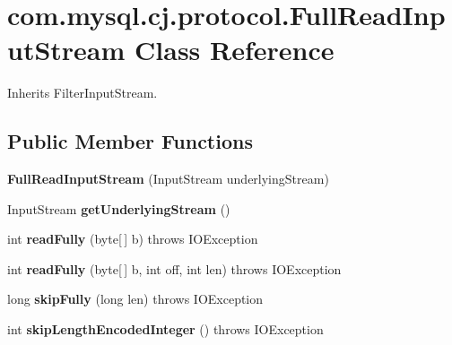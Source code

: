 \hypertarget{classcom_1_1mysql_1_1cj_1_1protocol_1_1_full_read_input_stream}{}\section{com.\+mysql.\+cj.\+protocol.\+Full\+Read\+Input\+Stream Class Reference}
\label{classcom_1_1mysql_1_1cj_1_1protocol_1_1_full_read_input_stream}


Inherits Filter\+Input\+Stream.

\subsection*{Public Member Functions}
\begin{DoxyCompactItemize}
\item 
\mbox{\label{classcom_1_1mysql_1_1cj_1_1protocol_1_1_full_read_input_stream_a130d34d6a6733b58df753dd2387398e3}} 
{\bfseries Full\+Read\+Input\+Stream} (Input\+Stream underlying\+Stream)
\item 
\mbox{\label{classcom_1_1mysql_1_1cj_1_1protocol_1_1_full_read_input_stream_a0d7c455b08cbaecf1bccf13332902e80}} 
Input\+Stream {\bfseries get\+Underlying\+Stream} ()
\item 
\mbox{\label{classcom_1_1mysql_1_1cj_1_1protocol_1_1_full_read_input_stream_a99afc4ea0c7401e413b2a563118d8b54}} 
int {\bfseries read\+Fully} (byte\mbox{[}$\,$\mbox{]} b)  throws I\+O\+Exception 
\item 
\mbox{\label{classcom_1_1mysql_1_1cj_1_1protocol_1_1_full_read_input_stream_aaa9ec02b3506e269f2c62e8a829244cd}} 
int {\bfseries read\+Fully} (byte\mbox{[}$\,$\mbox{]} b, int off, int len)  throws I\+O\+Exception 
\item 
\mbox{\label{classcom_1_1mysql_1_1cj_1_1protocol_1_1_full_read_input_stream_ae18612336a0a065c22bcdf5da96f178b}} 
long {\bfseries skip\+Fully} (long len)  throws I\+O\+Exception 
\item 
\mbox{\label{classcom_1_1mysql_1_1cj_1_1protocol_1_1_full_read_input_stream_a2fbcd02fc93bec4299d52e1f795a043c}} 
int {\bfseries skip\+Length\+Encoded\+Integer} ()  throws I\+O\+Exception 
\end{DoxyCompactItemize}


